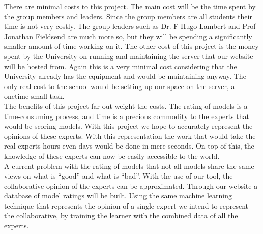 \documentclass{ecmm427_assignment}
\begin{document}
\quad There are minimal costs to this project. The main cost will be the time spent by the group members and leaders. Since the group members are all students their time is not very costly. The group leaders such as Dr. F Hugo Lambert and Prof Jonathan Fieldsend are much more so, but they will be spending a significantly smaller amount of time working on it. The other cost of this project is the money spent by the University on running and maintaining the server that our website will be hosted from. Again this is a very minimal cost considering that the University already has the equipment and would be maintaining anyway. The only real cost to the school would be setting up our space on the server, a onetime small task.\\

\quad The benefits of this project far out weight the costs. The rating of models is a time-consuming process, and time is a precious commodity to the experts that would be scoring models. With this project we hope to accurately represent the opinions of these experts. With this representation the work that would take the real experts hours even days would be done in mere seconds. On top of this, the knowledge of these experts can now be easily accessible to the world.\\

\quad A current problem with the rating of models that not all models share the same views on what is “good” and what is “bad”. With the use of our tool, the collaborative opinion of the experts can be approximated. Through our website a database of model ratings will be built. Using the same machine learning technique that represents the opinion of a single expert we intend to represent the collaborative, by training the learner with the combined data of all the experts.\\




\end{document}
